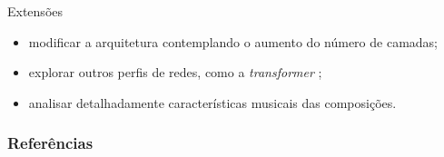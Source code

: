 \documentclass{beamer}
\begin{document}
    \begin{frame}{Extensões}
        \begin{itemize}
            \justifying
            \item modificar a arquitetura contemplando o aumento do número de camadas;
            \item explorar outros perfis de redes, como a \textit{transformer} \citep{vaswani2017};
            \item analisar detalhadamente características musicais das composições.
        \end{itemize}
    \end{frame}



%
    \begin{frame}[allowframebreaks]
        \frametitle{Referências}
        
        
    \end{frame}
\end{document}
